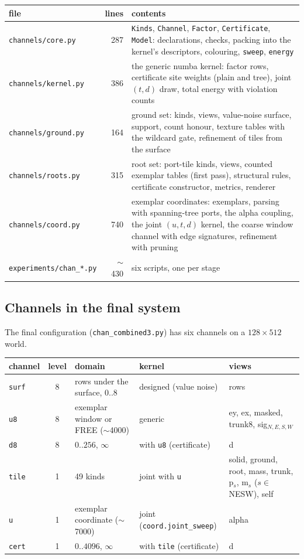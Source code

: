 \documentclass[11pt]{article}
\newcommand{\1}{\mathds{1}}
\newcommand{\code}[1]{\texttt{#1}}
\begin{document}
\begin{center}\small
\begin{tabular}{@{}l r p{3.6in}@{}}
\toprule
file & lines & contents \\
\midrule
\code{channels/core.py} & 287 & \code{Kinds}, \code{Channel}, \code{Factor},
  \code{Certificate}, \code{Model}: declarations, checks, packing into the
  kernel's descriptors, colouring, \code{sweep}, \code{energy} \\
\code{channels/kernel.py} & 386 & the generic numba kernel: factor rows,
  certificate site weights (plain and tree), joint $(t, d)$ draw, total
  energy with violation counts \\
\code{channels/ground.py} & 164 & ground set: kinds, views, value-noise
  surface, support, count honour, texture tables with the wildcard gate,
  refinement of tiles from the surface \\
\code{channels/roots.py} & 315 & root set: port-tile kinds, views,
  counted exemplar tables (first pass), structural rules, certificate
  constructor, metrics, renderer \\
\code{channels/coord.py} & 740 & exemplar coordinates: exemplars, parsing
  with spanning-tree ports, the alpha coupling, the joint $(u, t, d)$
  kernel, the coarse window channel with edge signatures, refinement
  with pruning \\
\code{experiments/chan\_*.py} & $\sim$430 & six scripts, one per stage \\
\bottomrule
\end{tabular}
\end{center}

\subsection{Channels in the final system}

The final configuration (\code{chan\_combined3.py}) has six channels on a
$128 \times 512$ world.

\begin{center}\footnotesize
\begin{tabular}{@{}l c p{1.5in} p{1.3in} p{1.9in}@{}}
\toprule
channel & level & domain & kernel & views \\
\midrule
\code{surf} & 8 & rows under the surface, $0..8$ & designed (value noise) & rows \\
\code{u8} & 8 & exemplar window or FREE ($\sim$4000) & generic & ey, ex, masked, trunk8, sig$_{N,E,S,W}$ \\
\code{d8} & 8 & $0..256$, $\infty$ & with \code{u8} (certificate) & d \\
\code{tile} & 1 & 49 kinds & joint with \code{u} & solid, ground, root, mass, trunk, p$_s$, m$_s$ ($s \in$ NESW), self \\
\code{u} & 1 & exemplar coordinate ($\sim$7000) & joint (\code{coord.joint\_sweep}) & alpha \\
\code{cert} & 1 & $0..4096$, $\infty$ & with \code{tile} (certificate) & d \\
\bottomrule
\end{tabular}
\end{center}
\end{document}
